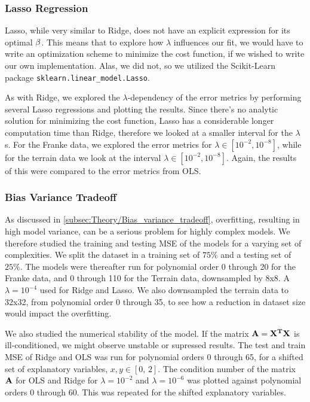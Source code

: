 \documentclass[10pt, twocolumn]{article}
\begin{document}
\subsubsection{Lasso Regression}
Lasso, while very similar to Ridge, does not have an explicit expression for its optimal $\vb{\beta}$. This means that to explore how $\lambda$ influences our fit, we would have to write an optimization scheme to minimize the cost function, if we wished to write our own implementation. Alas, we did not, so we utilized the Scikit-Learn package \texttt{sklearn.linear\_model.Lasso}. 

As with Ridge, we explored the $\lambda$-dependency of the error metrics by performing several Lasso regressions and plotting the results. Since there's no analytic solution for minimizing the cost function, Lasso has a considerable longer computation time than Ridge, therefore we looked at a smaller interval for the $\lambda$s. For the Franke data, we explored the error metrics for $\lambda \in [10^{-2}, 10^{-8}]$, while for the terrain data we look at the interval $\lambda \in [10^{-2}, 10^{-8}]$. Again, the results of this were compared to the error metrics from OLS. 

\subsubsection{Bias Variance Tradeoff}
\label{subsubsec:Method/Bias_variance_tradeoff}
As discussed in \cref{subsec:Theory/Bias_variance_tradeoff}, overfitting, resulting in high model variance, can be a serious problem for highly complex models. We therefore studied the training and testing MSE of the models for a varying set of complexities. We split the dataset in a training set of $75\%$ and a testing set of $25\%$. The models were thereafter run for polynomial order 0 through 20 for the Franke data, and 0 through 110 for the Terrain data, downsampled by 8x8. A $\lambda = 10^{-4}$ used for Ridge and Lasso. We also downsampled the terrain data to 32x32, from polynomial order 0 through 35, to see how a reduction in dataset size would impact the overfitting.

We also studied the numerical stability of the model. If the matrix $\vb{A}= \vb{X^T}\vb{X}$ is ill-conditioned, we might observe unstable or supressed results. The test and train MSE of Ridge and OLS was run for polynomial orders 0 through 65, for a shifted set of explanatory variables, $x,y \in [0,\, 2]$. The condition number of the matrix $\vb{A}$ for OLS and Ridge for $\lambda = 10^{-2}$ and $\lambda = 10^{-6}$ was plotted against polynomial orders 0 through 60. This was repeated for the shifted explanatory variables.
\end{document}
